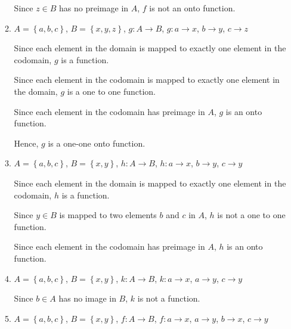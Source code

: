 \documentclass[12pt]{report}
\begin{document}
\begin{enumerate}
\begin{enumerate}
                        Since $z \in B$ has no preimage in $A$, $f$ is not an onto function.

                  \item $A = \left\{a, b, c\right\}$, $B = \left\{x, y, z\right\}$, $g: A \to
                              B$, $g: a \to x$, $b \to y$, $c \to z$
                        \sol{}

                        Since each element in the domain is mapped to exactly one element in the
                        codomain, $g$ is a function.

                        Since each element in the codomain is mapped to exactly one element in the
                        domain, $g$ is a one to one function.

                        Since each element in the codomain has preimage in $A$, $g$ is an onto
                        function.

                        Hence, $g$ is a one-one onto function.

                        \newpage

                  \item $A = \left\{a, b, c\right\}$, $B = \left\{x, y\right\}$, $h: A \to
                              B$, $h: a \to x$, $b \to y$, $c \to y$
                        \sol{}

                        Since each element in the domain is mapped to exactly one element in the
                        codomain, $h$ is a function.

                        Since $y \in B$ is mapped to two elements $b$ and $c$ in $A$, $h$ is not a one
                        to one function.

                        Since each element in the codomain has preimage in $A$, $h$ is an onto
                        function.

                  \item $A = \left\{a, b, c\right\}$, $B = \left\{x, y\right\}$, $k: A \to
                              B$, $k: a \to x$, $a \to y$, $c \to y$
                        \sol{}

                        Since $b \in A$ has no image in $B$, $k$ is not a function.

                  \item $A = \left\{a, b, c\right\}$, $B = \left\{x, y\right\}$, $f: A \to B$, $f: a \to x$, $a \to y$, $b \to x$, $c \to y$
                        \sol{}


\end{enumerate}
\end{enumerate}
\end{document}
